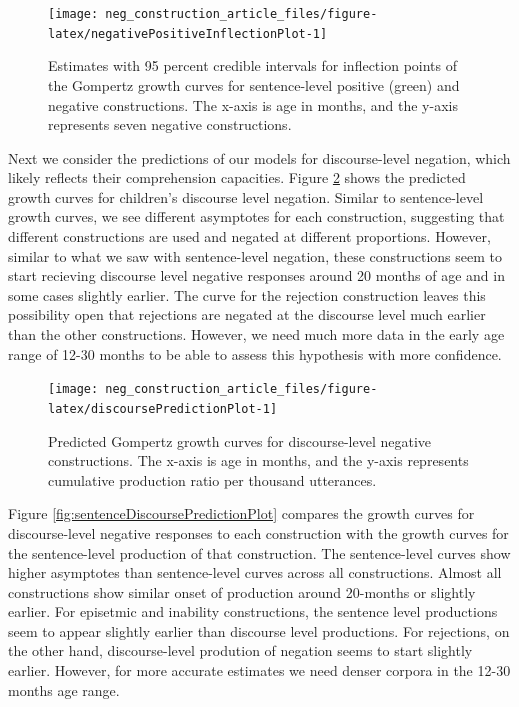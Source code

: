 \documentclass[
  man,floatsintext]{apa6}
\begin{document}
\begin{figure}[H]

{\centering \texttt{[image: neg\_construction\_article\_files/figure-latex/negativePositiveInflectionPlot-1]} 

}

\caption{Estimates with 95 percent credible intervals for inflection points of the Gompertz growth curves for sentence-level positive (green) and negative constructions. The x-axis is age in months, and the y-axis represents seven negative constructions.}\label{fig:negativePositiveInflectionPlot}
\end{figure}

Next we consider the predictions of our models for discourse-level negation, which likely reflects their comprehension capacities. Figure \ref{fig:discoursePredictionPlot} shows the predicted growth curves for children's discourse level negation. Similar to sentence-level growth curves, we see different asymptotes for each construction, suggesting that different constructions are used and negated at different proportions. However, similar to what we saw with sentence-level negation, these constructions seem to start recieving discourse level negative responses around 20 months of age and in some cases slightly earlier. The curve for the rejection construction leaves this possibility open that rejections are negated at the discourse level much earlier than the other constructions. However, we need much more data in the early age range of 12-30 months to be able to assess this hypothesis with more confidence.

\begin{figure}[H]

{\centering \texttt{[image: neg\_construction\_article\_files/figure-latex/discoursePredictionPlot-1]} 

}

\caption{Predicted Gompertz growth curves for discourse-level negative constructions. The x-axis is age in months, and the y-axis represents cumulative production ratio per thousand utterances.}\label{fig:discoursePredictionPlot}
\end{figure}

Figure \ref{fig:sentenceDiscoursePredictionPlot} compares the growth curves for discourse-level negative responses to each construction with the growth curves for the sentence-level production of that construction. The sentence-level curves show higher asymptotes than sentence-level curves across all constructions. Almost all constructions show similar onset of production around 20-months or slightly earlier. For episetmic and inability constructions, the sentence level productions seem to appear slightly earlier than discourse level productions. For rejections, on the other hand, discourse-level prodution of negation seems to start slightly earlier. However, for more accurate estimates we need denser corpora in the 12-30 months age range.
\end{document}
